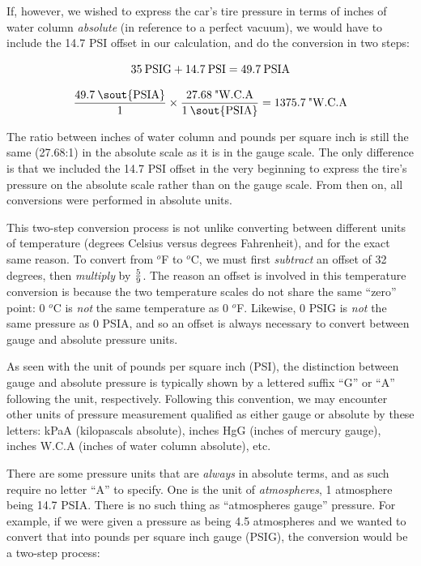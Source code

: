 \vskip 10pt

If, however, we wished to express the car's tire pressure in terms of inches of water column \textit{absolute} (in reference to a perfect vacuum), we would have to include the 14.7 PSI offset in our calculation, and do the conversion in two steps:

$$35 \> \hbox{PSIG} + 14.7 \> \hbox{PSI} = 49.7 \> \hbox{PSIA}$$

$${{49.7 \> \hbox{\sout{PSIA}}} \over 1} \times {{27.68 \> \hbox{"W.C.A}} \over {1 \> \hbox{\sout{PSIA}}}} = 1375.7 \> \hbox{"W.C.A}$$

The ratio between inches of water column and pounds per square inch is still the same (27.68:1) in the absolute scale as it is in the gauge scale.  The only difference is that we included the 14.7 PSI offset in the very beginning to express the tire's pressure on the absolute scale rather than on the gauge scale.  From then on, all conversions were performed in absolute units.

This two-step conversion process is not unlike converting between different units of temperature (degrees Celsius versus degrees Fahrenheit), and for the exact same reason.  To convert from $^{o}$F to $^{o}$C, we must first \textit{subtract} an offset of 32 degrees, then \textit{multiply} by $5 \over 9$.  The reason an offset is involved in this temperature conversion is because the two temperature scales do not share the same ``zero'' point: 0 $^{o}$C is \textit{not} the same temperature as 0 $^{o}$F.  Likewise, 0 PSIG is \textit{not} the same pressure as 0 PSIA, and so an offset is always necessary to convert between gauge and absolute pressure units.

\vskip 10pt

\filbreak

As seen with the unit of pounds per square inch (PSI), the distinction between gauge and absolute pressure is typically shown by a lettered suffix ``G'' or ``A'' following the unit, respectively.  Following this convention, we may encounter other units of pressure measurement qualified as either gauge or absolute by these letters: kPaA (kilopascals absolute), inches HgG (inches of mercury gauge), inches W.C.A (inches of water column absolute), etc.  

There are some pressure units that are \textit{always} in absolute terms, and as such require no letter ``A'' to specify.  One is the unit of \textit{atmospheres}, 1 atmosphere being 14.7 PSIA.  There is no such thing as ``atmospheres gauge'' pressure.  For example, if we were given a pressure as being 4.5 atmospheres and we wanted to convert that into pounds per square inch gauge (PSIG), the conversion would be a two-step process: 

